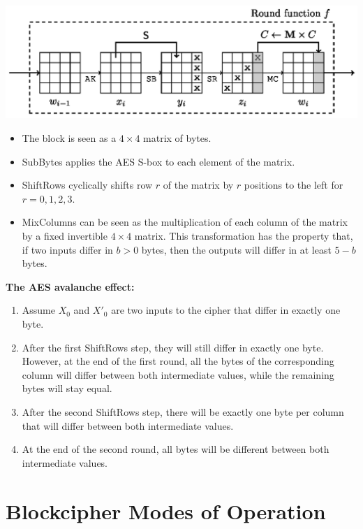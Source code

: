 	    \begin{center}
			\includegraphics[width=140mm]{Graphics/Block Ciphers/bc5.png}
		\end{center}
		\begin{itemize}
			\item The block is seen as a $4 \times 4$ matrix of bytes.
			\item SubBytes applies the AES S-box to each element of the matrix.
			\item ShiftRows cyclically shifts row $r$ of the matrix by $r$ positions to the left for $r = 0,1,2,3$.
			\item MixColumns can be seen as the multiplication of each column of the matrix by a fixed invertible $4 \times 4$ matrix.
			This transformation has the property that, if two inputs differ in $b > 0$ bytes, then the outputs will differ in at least $5-b$ bytes.
		\end{itemize}
\newpage
		\textbf{The AES avalanche effect:}
		\begin{enumerate}
			\item Assume $X_0$ and $X'_0$ are two inputs to the cipher that differ in exactly one byte.
			\item After the first ShiftRows step, they will still differ in exactly one byte.
			However, at the end of the first round, all the bytes of the corresponding column will differ between both intermediate values, while the remaining bytes will stay equal.
			\item After the second ShiftRows step, there will be exactly one byte per column that will differ between both intermediate values.
			\item At the end of the second round, all bytes will be different between both intermediate values.
		\end{enumerate}

\section{Blockcipher Modes of Operation}
